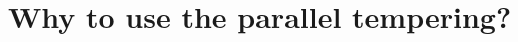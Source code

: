 \documentclass[xetex]{beamer}
\begin{document}



	\section[Why bother?]{Why to use the parallel tempering?}
	



	

\end{document}

